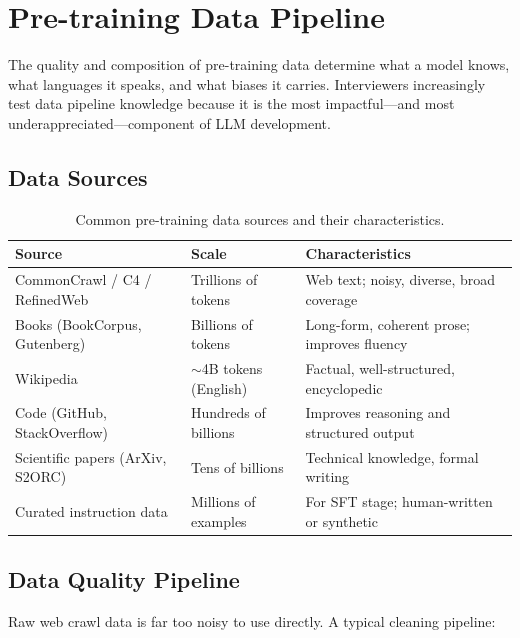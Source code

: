 \section{Pre-training Data Pipeline}
\label{sec:pretraining-data}

The quality and composition of pre-training data determine what a model knows,
what languages it speaks, and what biases it carries.  Interviewers increasingly
test data pipeline knowledge because it is the most impactful---and most
underappreciated---component of LLM development.

\subsection{Data Sources}

\begin{table}[H]
\centering
\small
\begin{tabularx}{\textwidth}{@{}l l X@{}}
\toprule
\textbf{Source} & \textbf{Scale} & \textbf{Characteristics} \\
\midrule
CommonCrawl / C4 / RefinedWeb & Trillions of tokens & Web text; noisy, diverse, broad coverage \\
Books (BookCorpus, Gutenberg) & Billions of tokens & Long-form, coherent prose; improves fluency \\
Wikipedia & $\sim$4B tokens (English) & Factual, well-structured, encyclopedic \\
Code (GitHub, StackOverflow) & Hundreds of billions & Improves reasoning and structured output \\
Scientific papers (ArXiv, S2ORC) & Tens of billions & Technical knowledge, formal writing \\
Curated instruction data & Millions of examples & For SFT stage; human-written or synthetic \\
\bottomrule
\end{tabularx}
\caption{Common pre-training data sources and their characteristics.}
\label{tab:data-sources}
\end{table}

\subsection{Data Quality Pipeline}

Raw web crawl data is far too noisy to use directly.  A typical cleaning pipeline:

